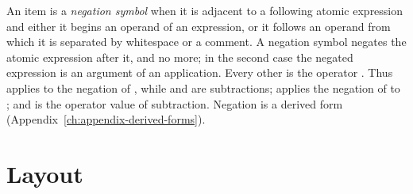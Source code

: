 An item \kw{-} is a \emph{negation symbol} when it is adjacent to a following
atomic expression and either it begins an operand of an expression, or it
follows an operand from which it is separated by whitespace or a comment. A
negation symbol negates the atomic expression after it, and no more; in the
second case the negated expression is an argument of an application. Every
other \kw{-} is the operator \kw{-}. Thus  applies  to the
negation of , while  and  are subtractions; 
applies the negation of  to ; and \kw{(-)} is the operator value
of subtraction. Negation is a derived form
(Appendix~\ref{ch:appendix-derived-forms}).

\section{Layout}\label{sec:syntax-core-layout}

